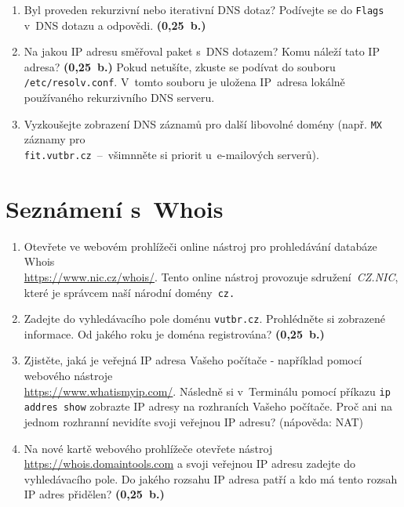 \begin{enumerate}
    \item Byl proveden rekurzivní nebo iterativní DNS dotaz? Podívejte se do \texttt{Flags} v~DNS dotazu a odpovědi. \textbf{(0,25~b.)}
    \item Na jakou IP adresu směřoval paket s~DNS dotazem? Komu náleží tato IP adresa? \textbf{(0,25~b.)} Pokud netušíte, zkuste se podívat do souboru \texttt{/etc/resolv.conf}. V~tomto souboru je uložena IP~adresa lokálně používaného rekurzivního DNS serveru.
    \item Vyzkoušejte zobrazení DNS záznamů pro další libovolné domény (např. \texttt{MX} záznamy pro\\ \texttt{fit.vutbr.cz}~--~všimnněte si priorit u~e-mailových serverů).
\end{enumerate}

\section{Seznámení s~Whois}
\begin{enumerate}
    \item Otevřete ve webovém prohlížeči online nástroj pro prohledávání databáze Whois\\ \url{https://www.nic.cz/whois/}. Tento online nástroj provozuje sdružení~\emph{CZ.NIC}, které je správcem naší národní domény~\texttt{cz.}
    \item Zadejte do vyhledávacího pole doménu \texttt{vutbr.cz}. Prohlédněte si zobrazené informace. Od jakého roku je doména registrována? \textbf{(0,25~b.)}
    \item Zjistěte, jaká je veřejná IP adresa Vašeho počítače - například pomocí webového nástroje\\ \url{https://www.whatismyip.com/}. Následně si v~Terminálu pomocí příkazu \texttt{ip addres show} zobrazte IP adresy na rozhraních Vašeho počítače. Proč ani na jednom rozhranní nevidíte svoji veřejnou IP adresu? (nápověda: NAT)
    \item Na nové kartě webového prohlížeče otevřete nástroj \url{https://whois.domaintools.com} a svoji veřejnou IP adresu zadejte do vyhledávacího pole. Do jakého rozsahu IP adresa patří a kdo má tento rozsah IP adres přidělen? \textbf{(0,25~b.)}
\end{enumerate}

